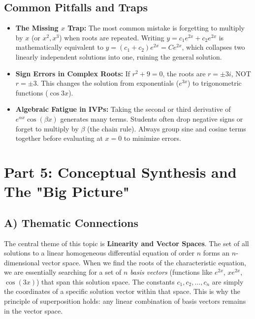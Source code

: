 \documentclass[11pt, a4paper]{article}
\theoremstyle{definition}
\theoremstyle{remark}
\begin{document}
\subsection{Common Pitfalls and Traps}
\begin{itemize}
    \item \textbf{The Missing $x$ Trap:} The most common mistake is forgetting to multiply by $x$ (or $x^2, x^3$) when roots are repeated. Writing $y = c_1 e^{2x} + c_2 e^{2x}$ is mathematically equivalent to $y = (c_1+c_2)e^{2x} = C e^{2x}$, which collapses two linearly independent solutions into one, ruining the general solution.
    \item \textbf{Sign Errors in Complex Roots:} If $r^2 + 9 = 0$, the roots are $r = \pm 3i$, NOT $r = \pm 3$. This changes the solution from exponentials ($e^{3x}$) to trigonometric functions ($\cos 3x$).
    \item \textbf{Algebraic Fatigue in IVPs:} Taking the second or third derivative of $e^{\alpha x} \cos(\beta x)$ generates many terms. Students often drop negative signs or forget to multiply by $\beta$ (the chain rule). Always group sine and cosine terms together before evaluating at $x=0$ to minimize errors.
\end{itemize}

\newpage
\section{Part 5: Conceptual Synthesis and The "Big Picture"}

\subsection{A) Thematic Connections}
The central theme of this topic is \textbf{Linearity and Vector Spaces}. The set of all solutions to a linear homogeneous differential equation of order $n$ forms an $n$-dimensional vector space. 
When we find the roots of the characteristic equation, we are essentially searching for a set of $n$ \textit{basis vectors} (functions like $e^{2x}$, $xe^{2x}$, $\cos(3x)$) that span this solution space. The constants $c_1, c_2, \dots, c_n$ are simply the coordinates of a specific solution vector within that space. This is why the principle of superposition holds: any linear combination of basis vectors remains in the vector space.
\end{document}
